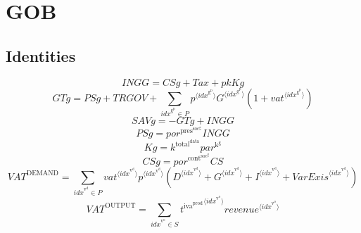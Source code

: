 \section{GOB}

\subsection{Identities}

\begin{equation}
{I\!N\!G\!G} = {C\!S\!g} + {T\!a\!x} + {{p\!k}} {{K\!g}}
\end{equation}
\begin{equation}
{G\!T\!g} = {P\!S\!g} + {T\!R\!G\!O\!V} + \sum_{{i\!d\!x}^{\mathrm{g}^{\mathrm{p}}}\in P} {{p}^{\langle {i\!d\!x}^{\mathrm{g}^{\mathrm{p}}}\rangle}} {{G}^{\langle {i\!d\!x}^{\mathrm{g}^{\mathrm{p}}}\rangle}} \left(1 + {{v\!a\!t}}^{\langle {i\!d\!x}^{\mathrm{g}^{\mathrm{p}}}\rangle}\right)
\end{equation}
\begin{equation}
{S\!A\!V\!g} = -{G\!T\!g} + {I\!N\!G\!G}
\end{equation}
\begin{equation}
{P\!S\!g} = {{p\!o\!r}^{\mathrm{pres}^{\mathrm{soc}^{\mathrm{g}}}}} {{I\!N\!G\!G}}
\end{equation}
\begin{equation}
{K\!g} = {k^{\mathrm{total}^{\mathrm{data}}}} {{p\!a\!r}^{\mathrm{k}^{\mathrm{g}}}}
\end{equation}
\begin{equation}
{C\!S\!g} = {{p\!o\!r}^{\mathrm{cont}^{\mathrm{soc}^{\mathrm{g}}}}} {{C\!S}}
\end{equation}
\begin{equation}
{V\!A\!T}^{\mathrm{DEMAND}} = \sum_{{i\!d\!x}^{\mathrm{v}^{\mathrm{d}}}\in P} {{{v\!a\!t}}^{\langle {i\!d\!x}^{\mathrm{v}^{\mathrm{d}}}\rangle}} {{p}^{\langle {i\!d\!x}^{\mathrm{v}^{\mathrm{d}}}\rangle}} \left({D}^{\langle {i\!d\!x}^{\mathrm{v}^{\mathrm{d}}}\rangle} + {G}^{\langle {i\!d\!x}^{\mathrm{v}^{\mathrm{d}}}\rangle} + {I}^{\langle {i\!d\!x}^{\mathrm{v}^{\mathrm{d}}}\rangle} + {{V\!a\!r\!E\!x\!i\!s}}^{\langle {i\!d\!x}^{\mathrm{v}^{\mathrm{d}}}\rangle}\right)
\end{equation}
\begin{equation}
{V\!A\!T}^{\mathrm{OUTPUT}} = \sum_{{i\!d\!x}^{\mathrm{v}^{\mathrm{o}}}\in S} {{t^{\mathrm{iva}^{\mathrm{prod}}}}^{\langle {i\!d\!x}^{\mathrm{v}^{\mathrm{o}}}\rangle}} {{{r\!e\!v\!e\!n\!u\!e}}^{\langle {i\!d\!x}^{\mathrm{v}^{\mathrm{o}}}\rangle}}
\end{equation}
